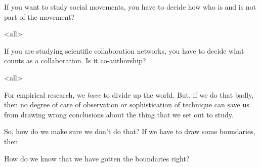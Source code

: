 If you want to study social movements, you have to decide how who is
and is not part of the movement?

\mode<all>{
}

If you are studying scientific collaboration networks, you have to
decide what counts as a collaboration. Is it co-authorship?


\mode<all>{
\blackout{}
}  

For empirical research, we \emph{have} to divide up the world. But, if we
do that badly, then no degree of care of observation or sophistication
of technique can save us from drawing wrong conclusions about the
thing that we set out to study.

So, how do we make sure we don't do that? If we have to draw some
boundaries, then

\begin{frame}
\begin{center}
How do we know that we have gotten the boundaries right?
\end{center}
\end{frame}

